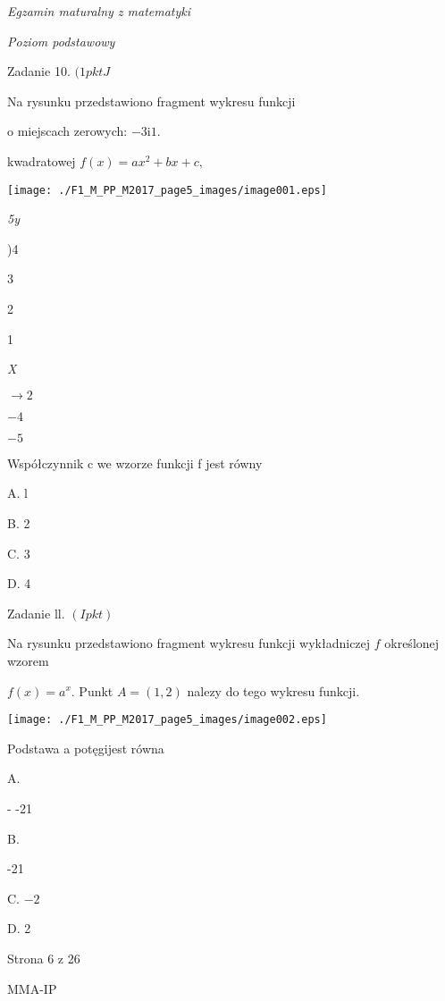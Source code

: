 \documentclass[a4paper,12pt]{article}
\begin{document}
{\it Egzamin maturalny z matematyki}

{\it Poziom podstawowy}

Zadanie 10. $(1pktJ$

Na rysunku przedstawiono fragment wykresu funkcji

o miejscach zerowych: $-3 \mathrm{i}1.$

kwadratowej $f(x)=ax^{2}+bx+c,$
\begin{center}
\texttt{[image: ./F1\_M\_PP\_M2017\_page5\_images/image001.eps]}
\end{center}
{\it 5y}

)4

3

2

1

{\it X}

$\rightarrow 2$

$-4$

$-5$

Współczynnik c we wzorze funkcji f jest równy

A. l

B. 2

C. 3

D. 4

Zadanie ll. $(Ipkt)$

Na rysunku przedstawiono fragment wykresu funkcji wykładniczej $f$ określonej wzorem

$f(x)=a^{x}$. Punkt $A=(1,2)$ nalezy do tego wykresu funkcji.
\begin{center}
\texttt{[image: ./F1\_M\_PP\_M2017\_page5\_images/image002.eps]}
\end{center}
Podstawa a potęgijest równa

A.

- -21

B.

-21

C. $-2$

D. 2

Strona 6 z 26

MMA-IP
\end{document}
